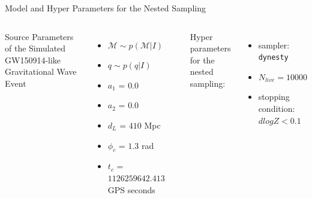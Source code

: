 \documentclass[
10pt,
aspectratio=169,
]{beamer}
\begin{document}
\begin{frame}{Model and Hyper Parameters for the Nested Sampling}
\begin{columns}[T]
Source Parameters of the Simulated GW150914-like Gravitational Wave Event
    \begin{itemize}
        \item $\mathcal{M} \sim p(\mathcal{M}|I)$ 
        \item $q \sim p(q|I)$ 
        \item $a_1$ = $0.0$ 
        \item  $a_2$ = $0.0$ 
        \item  $d_L$ = $410$ Mpc 
        \item $\phi_c$ = $1.3$ rad 
        \item $t_c$ = $1126259642.413$ GPS seconds 
    \end{itemize}
    \rule{.01mm}{.7\textheight}
Hyper parameters for the nested sampling:\\

\begin{itemize}
    \item sampler: \texttt{dynesty}
    \item $N_{live}=10000$ 
    \item stopping condition: $dlogZ<0.1$
\end{itemize}
\end{columns}
\end{frame}
\end{document}
